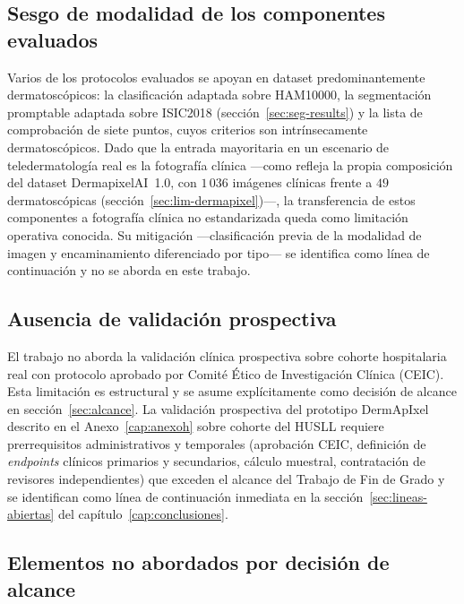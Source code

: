 \subsection{Sesgo de modalidad de los componentes evaluados}
\label{sec:lim-modalidad-sistema}

Varios de los protocolos evaluados se apoyan en dataset
predominantemente dermatoscópicos: la clasificación adaptada sobre
HAM10000, la segmentación promptable adaptada sobre ISIC2018
(sección~\ref{sec:seg-results}) y la lista de comprobación de
siete puntos, cuyos criterios son intrínsecamente dermatoscópicos.
Dado que la entrada mayoritaria en un escenario de teledermatología
real es la fotografía clínica ---como refleja la propia composición
del dataset DermapixelAI~1.0, con $1\,036$ imágenes clínicas frente a
$49$ dermatoscópicas (sección~\ref{sec:lim-dermapixel})---, la
transferencia de estos componentes a fotografía clínica no
estandarizada queda como limitación operativa conocida. Su
mitigación ---clasificación previa de la modalidad de imagen y
encaminamiento diferenciado por tipo--- se identifica como línea de
continuación y no se aborda en este trabajo.

\subsection{Ausencia de validación prospectiva}
\label{sec:lim-prospectivo}

El trabajo no aborda la validación clínica prospectiva sobre
cohorte hospitalaria real con protocolo aprobado por Comité Ético
de Investigación Clínica (CEIC). Esta limitación es estructural y
se asume explícitamente como decisión de alcance en
sección~\ref{sec:alcance}. La validación prospectiva del prototipo
DermApIxel descrito en el Anexo~\ref{cap:anexoh} sobre cohorte del
HUSLL requiere prerrequisitos administrativos y temporales
(aprobación CEIC, definición de \emph{endpoints} clínicos
primarios y secundarios, cálculo muestral, contratación de
revisores independientes) que exceden el alcance del Trabajo de
Fin de Grado y se identifican como línea de continuación inmediata
en la sección~\ref{sec:lineas-abiertas} del capítulo~\ref{cap:conclusiones}.

\subsection{Elementos no abordados por decisión de alcance}
\label{sec:lim-fuera}


